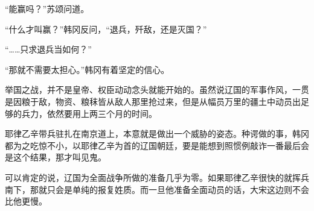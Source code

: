 “能赢吗？”苏颂问道。

“什么才叫赢？”韩冈反问，“退兵，歼敌，还是灭国？”

“……只求退兵当如何？”

“那就不需要太担心。”韩冈有着坚定的信心。

举国之战，并不是皇帝、权臣动动念头就能开始的。虽然说辽国的军事作风，一贯是因粮于敌，物资、粮秣皆从敌人那里抢过来，但是从幅员万里的疆土中动员出足够的兵力，依然要用上两三个月的时间。

耶律乙辛带兵驻扎在南京道上，本意就是做出一个威胁的姿态。种谔做的事，韩冈都为之吃惊不小，以耶律乙辛为首的辽国朝廷，要是能想到照惯例敲诈一番最后会是这个结果，那才叫见鬼。

可以肯定的说，辽国为全面战争所做的准备几乎为零。如果耶律乙辛很快的就挥兵南下，那就只会是单纯的报复姓质。而一旦他准备全面动员的话，大宋这边则不会比他更慢。
